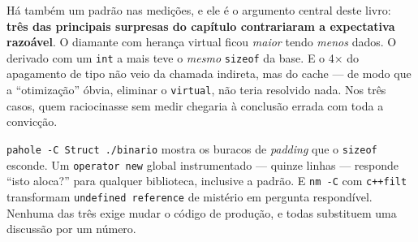 Há também um padrão nas medições, e ele é o argumento central deste livro:
\textbf{três das principais surpresas do capítulo contrariaram a expectativa
razoável}. O diamante com herança virtual ficou \emph{maior} tendo \emph{menos}
dados. O derivado com um \texttt{int} a mais teve o \emph{mesmo} \texttt{sizeof}
da base. E o 4× do apagamento de tipo não veio da chamada indireta, mas do cache
--- de modo que a ``otimização'' óbvia, eliminar o \texttt{virtual}, não teria
resolvido nada. Nos três casos, quem raciocinasse sem medir chegaria à conclusão
errada com toda a convicção.

\begin{regra}
\texttt{pahole -C Struct ./binario} mostra os buracos de \emph{padding} que o
\texttt{sizeof} esconde. Um \texttt{operator new} global instrumentado ---
quinze linhas --- responde ``isto aloca?'' para qualquer biblioteca, inclusive a
padrão. E \texttt{nm -C} com \texttt{c++filt} transformam
\texttt{undefined reference} de mistério em pergunta respondível. Nenhuma das
três exige mudar o código de produção, e todas substituem uma discussão por um
número.
\end{regra}
